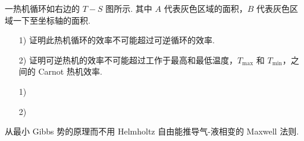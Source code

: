 \documentclass{assignment}
\begin{document}
\begin{prob}
    一热机循环如右边的 $T-S$ 图所示. 其中 $A$ 代表灰色区域的面积，$B$ 代表灰色区域一下至坐标轴的面积.
    \begin{itemize}
        \item[1)] 证明此热机循环的效率不可能超过可逆循环的效率.
        \item[2)] 证明可逆热机的效率不可能超过工作于最高和最低温度，$T_{\max}$ 和 $T_{\min}$，之间的 Carnot 热机效率.
    \end{itemize}
\end{prob}
\begin{pf}
    \begin{itemize}
        \item[1)] 
        \item[2)] 
    \end{itemize}
\end{pf}

\begin{prob}
    从最小 Gibbs 势的原理而不用 Helmholtz 自由能推导气-液相变的 Maxwell 法则.
\end{prob}
\begin{pf}
    
\end{pf}
\end{document}
